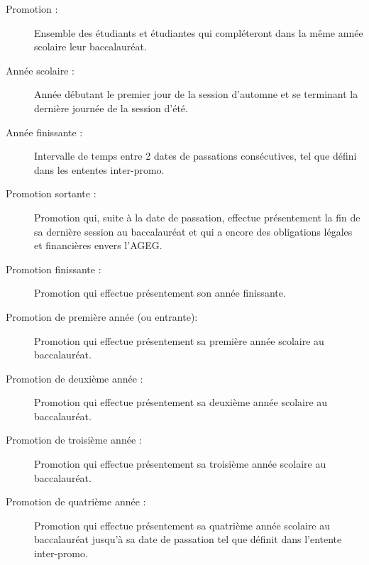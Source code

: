 \begin{description}

\item[Promotion :]{Ensemble des étudiants et étudiantes qui compléteront dans la même année scolaire leur baccalauréat.}

\item[Année scolaire :]{Année débutant le premier jour de la session d'automne et se terminant la dernière journée de la session d'été.}

\item[Année finissante :]{Intervalle de temps entre 2 dates de passations consécutives, tel que défini dans les ententes inter-promo.}

\item[Promotion sortante :]{Promotion qui, suite à la date de passation, effectue présentement la fin de sa dernière session au baccalauréat et qui a encore des obligations légales et financières envers l’AGEG.}

\item[Promotion finissante :]{Promotion qui effectue présentement son année finissante.}

\item[Promotion  de première année (ou entrante):]{Promotion qui effectue présentement sa première année scolaire au baccalauréat.}

\item[Promotion de deuxième année :]{Promotion qui effectue présentement sa deuxième année scolaire au baccalauréat.}

\item[Promotion de troisième année :]{Promotion qui effectue présentement sa troisième année scolaire au baccalauréat.}

\item[Promotion de quatrième année :]{Promotion qui effectue présentement sa quatrième année scolaire au baccalauréat jusqu'à sa date de passation tel que définit dans l'entente inter-promo.}

\end{description}
